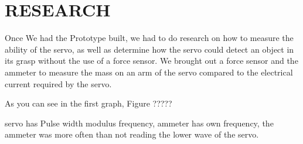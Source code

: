 \section{RESEARCH}
\label{sec:Research}

Once We had the Prototype built, we had to do research on how to measure the ability of the servo, as well as determine how the servo could detect an object in its grasp without the use of a force sensor. We brought out a force sensor and the ammeter to measure the mass on an arm of the servo compared to the electrical current required by the servo. 

As you can see in the first graph, Figure ????? 

servo has Pulse width modulus frequency, ammeter has own frequency, the ammeter was more often than not reading the lower wave of the servo. 